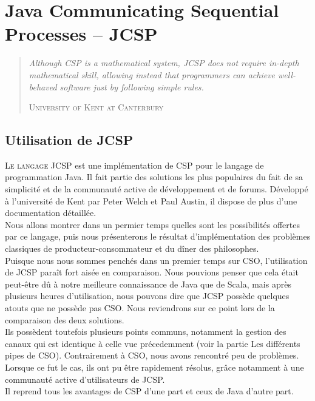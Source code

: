 \documentclass[a4paper,11pt,french]{report}
\begin{document}
\chapter[JCSP]{Java Communicating Sequential Processes -- JCSP}
\begin{quotation}
\textit{\og Although CSP is a mathematical system, JCSP does not require in-depth mathematical skill, allowing instead that programmers can achieve well-behaved software just by following simple rules.\fg}
\begin{flushright}
\textsc{University of Kent at Canterbury}
\end{flushright}
\end{quotation}

\section{Utilisation de JCSP}

\lettrine{L}{e langage} JCSP est une implémentation de CSP pour le langage de programmation Java. Il fait partie des solutions les plus populaires du fait de sa simplicité et de la communauté active de développement et de forums. Développé à l'université de Kent par Peter Welch et Paul Austin, il dispose de plus d'une documentation détaillée.\\

Nous allons montrer dans un permier temps quelles sont les possibilités offertes par ce langage, puis nous présenterons le résultat d'implémentation des problèmes classiques de producteur-consommateur et du dîner des philosophes.\\

Puisque nous nous sommes penchés dans un premier temps sur CSO, l'utilisation de JCSP paraît fort aisée en comparaison. Nous pouvions penser que cela était peut-être dû à notre meilleure connaissance de Java que de Scala, mais après plusieurs heures d'utilisation, nous pouvons dire que JCSP possède quelques atouts que ne possède pas CSO. Nous reviendrons sur ce point lors de la comparaison des deux solutions.\\

Ils possèdent toutefois plusieurs points communs, notamment la gestion des canaux qui est identique à celle vue précedemment (voir la partie Les différents pipes de CSO).
Contrairement à CSO, nous avons rencontré peu de problèmes. Lorsque ce fut le cas, ils ont pu être rapidement résolus, grâce notamment à une communauté active d'utilisateurs de JCSP.\\
Il reprend tous les avantages de CSP d'une part et ceux de Java d'autre part.\\
\end{document}
